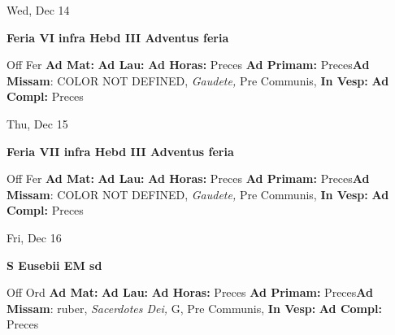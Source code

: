 \documentclass[10pt]{memoir}
\begin{document}
\begin{center}
\begin{minipage}{3.5in}
\vspace{2em}
\begin{center}Wed, Dec 14
\end{center}
\textbf{ \large Feria VI infra Hebd III Adventus
\textnormal{\normalsize feria}}

\begin{justify}Off Fer
\textbf{Ad Mat: }
\textbf{Ad Lau: }
\textbf{Ad Horas: }Preces
\textbf{Ad Primam: }Preces\textbf{Ad Missam}: COLOR NOT DEFINED, \textit{Gaudete,} Pre Communis, 
\textbf{In Vesp: }
\textbf{Ad Compl: }Preces
\end{justify}
\end{minipage}
\end{center}

\begin{center}
\begin{minipage}{3.5in}
\vspace{2em}
\begin{center}Thu, Dec 15
\end{center}
\textbf{ \large Feria VII infra Hebd III Adventus
\textnormal{\normalsize feria}}

\begin{justify}Off Fer
\textbf{Ad Mat: }
\textbf{Ad Lau: }
\textbf{Ad Horas: }Preces
\textbf{Ad Primam: }Preces\textbf{Ad Missam}: COLOR NOT DEFINED, \textit{Gaudete,} Pre Communis, 
\textbf{In Vesp: }
\textbf{Ad Compl: }Preces
\end{justify}
\end{minipage}
\end{center}

\begin{center}
\begin{minipage}{3.5in}
\vspace{2em}
\begin{center}Fri, Dec 16
\end{center}
\textbf{ \large S Eusebii EM
\textnormal{\normalsize sd}}

\begin{justify}Off Ord
\textbf{Ad Mat: }
\textbf{Ad Lau: }
\textbf{Ad Horas: }Preces
\textbf{Ad Primam: }Preces\textbf{Ad Missam}: ruber, \textit{Sacerdotes Dei,} G, Pre Communis, 
\textbf{In Vesp: }
\textbf{Ad Compl: }Preces
\end{justify}
\end{minipage}
\end{center}
\end{document}
